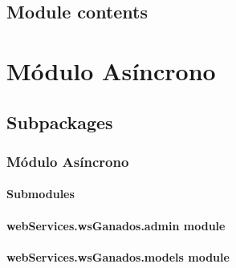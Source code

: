 \documentclass[letterpaper,10pt,spanish]{sphinxmanual}
\begin{document}
\begin{fulllineitems}
\label{reports:reports.views.view_report_female}
\end{fulllineitems}



\subsection{Module contents}
\label{reports:module-contents}\label{reports:module-reports}

\section{Módulo Asíncrono}
\label{webServices:webservices-package}\label{webServices::doc}

\subsection{Subpackages}
\label{webServices:subpackages}

\subsubsection{Módulo Asíncrono}
\label{webServices.wsGanados::doc}\label{webServices.wsGanados:webservices-wsganados-package}

\paragraph{Submodules}
\label{webServices.wsGanados:submodules}

\paragraph{webServices.wsGanados.admin module}
\label{webServices.wsGanados:module-webServices.wsGanados.admin}\label{webServices.wsGanados:webservices-wsganados-admin-module}

\paragraph{webServices.wsGanados.models module}
\label{webServices.wsGanados:module-webServices.wsGanados.models}\label{webServices.wsGanados:webservices-wsganados-models-module}
\end{document}
